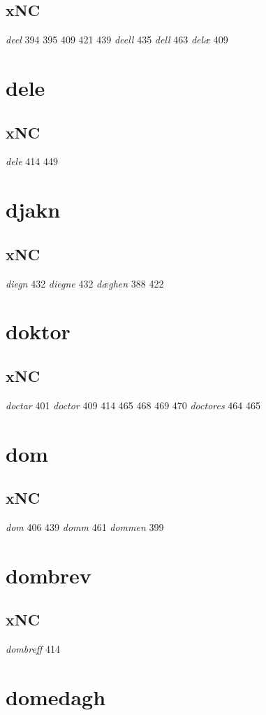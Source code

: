 \documentclass[a4paper,twocolumn]{article}
\begin{document}
\subsection{xNC}
\label{sec:orga661105}
\emph{deel} 394 395 409 421 439 \emph{deell} 435 \emph{dell} 463 \emph{delæ} 409 
\section{dele}
\label{sec:org27985f9}
\subsection{xNC}
\label{sec:orgbe8375e}
\emph{dele} 414 449 
\section{djakn}
\label{sec:orgdbe3650}
\subsection{xNC}
\label{sec:org1d2bedb}
\emph{diegn} 432 \emph{diegne} 432 \emph{dæghen} 388 422 
\section{doktor}
\label{sec:orgc2959bf}
\subsection{xNC}
\label{sec:org7988813}
\emph{doctar} 401 \emph{doctor} 409 414 465 468 469 470 \emph{doctores} 464 465 
\section{dom}
\label{sec:orgfa2c417}
\subsection{xNC}
\label{sec:orgf40ae02}
\emph{dom} 406 439 \emph{domm} 461 \emph{dommen} 399 
\section{dombrev}
\label{sec:org55c2ffd}
\subsection{xNC}
\label{sec:org6a775f0}
\emph{dombreff} 414 
\section{domedagh}
\label{sec:orgf816e7d}
\end{document}
